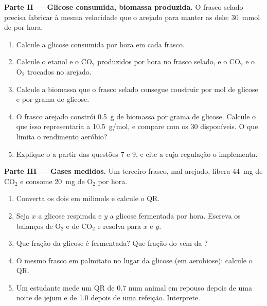 \begin{problem}
\medskip
\noindent\textbf{Parte II --- Glicose consumida, biomassa produzida.}
O frasco selado precisa fabricar  à mesma velocidade que o arejado
para manter as  dele: \qty{30}{mmol} de  por hora.
\begin{enumerate}[resume]
  \item Calcule a glicose consumida por hora em cada frasco.
  \item Calcule o etanol e o $\mathrm{CO_2}$ produzidos por hora no
        frasco selado, e o $\mathrm{CO_2}$ e o $\mathrm{O_2}$ trocados
        no arejado.
  \item Calcule a biomassa que o frasco selado consegue construir por
        mol de glicose e por grama de glicose.
  \item O frasco arejado constrói \qty{0.5}{g} de biomassa por grama de
        glicose. Calcule o  que isso representaria a
        \qty{10.5}{g/mol}, e compare com os 30  disponíveis. O que
        limita o rendimento aeróbio?
  \item Explique o  a partir das questões 7 e 9, e cite a
         cuja regulação o implementa.
\end{enumerate}

\medskip
\noindent\textbf{Parte III --- Gases medidos.}
Um terceiro frasco, mal arejado, libera \qty{44}{mg} de $\mathrm{CO_2}$
e consome \qty{20}{mg} de $\mathrm{O_2}$ por hora.
\begin{enumerate}[resume]
  \item Converta os dois em milimols e calcule o QR.
  \item Seja $x$ a glicose respirada e $y$ a glicose fermentada por
        hora. Escreva os balanços de $\mathrm{O_2}$ e de
        $\mathrm{CO_2}$ e resolva para $x$ e $y$.
  \item Que fração da glicose é fermentada? Que fração do  vem da
        ?
  \item O mesmo frasco em palmitato no lugar da glicose (em aerobiose):
        calcule o QR.
  \item Um estudante mede um QR de 0.7 num animal em repouso depois de
        uma noite de jejum e de 1.0 depois de uma refeição. Interprete.
\end{enumerate}


\end{problem}
